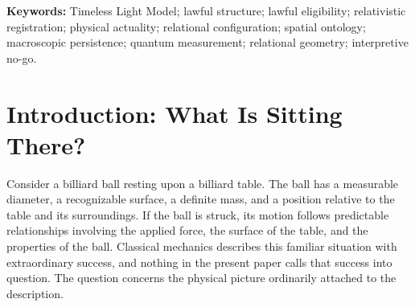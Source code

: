 \documentclass[12pt,onecolumn]{article}
\begin{document}
\begin{abstract}
Two interpretive no-go arguments follow. The success of classical measurement does not license the inference to primitive classical substance, and the success of geometric measurement does not license the inference to an independently existing spatial container. These restrictions do not challenge the predictive content of classical mechanics, quantum mechanics, or relativity. They concern the additional ontology conventionally attached to successful descriptions. The positive interpretation identifies physical actuality with lawful interactions and registered outcomes, configurations with the relational conditions expressed through those interactions, and spatial extension with their relativistically organized geometry. The universe is therefore not fundamentally a collection of completed things occupying completed space. It is one current lawful physical configuration expressed through actual interactions and their changing relationships, not a second, independent configuration-substance. The present is universal as a statement of physical actuality; elapsed proper time is local to each timelike worldline; and knowledge of distant present conditions is delayed by relativistic information propagation. This ontological present is not a universal clock or a preferred coordinate system. Space was never a completed container.

\end{abstract}

\noindent\textbf{Keywords:} Timeless Light Model; lawful structure; lawful eligibility; relativistic registration; physical actuality; relational configuration; spatial ontology; macroscopic persistence; quantum measurement; relational geometry; interpretive no-go.

\clearpage
\tableofcontents
\clearpage

\section{Introduction: What Is Sitting There?}

Consider a billiard ball resting upon a billiard table. The ball has a measurable diameter, a recognizable surface, a definite mass, and a position relative to the table and its surroundings. If the ball is struck, its motion follows predictable relationships involving the applied force, the surface of the table, and the properties of the ball. Classical mechanics describes this familiar situation with extraordinary success, and nothing in the present paper calls that success into question. The question concerns the physical picture ordinarily attached to the description.
\end{document}
